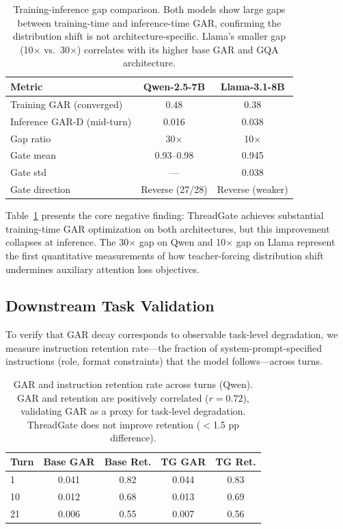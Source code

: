\documentclass[11pt]{article}
\begin{document}
\begin{table}[t]
\centering
\small
\begin{tabular}{lcc}
\toprule
\textbf{Metric} & \textbf{Qwen-2.5-7B} & \textbf{Llama-3.1-8B} \\
\midrule
Training GAR (converged)   & 0.48  & 0.38  \\
Inference GAR-D (mid-turn) & 0.016 & 0.038 \\
Gap ratio                  & 30$\times$ & 10$\times$ \\
\midrule
Gate mean                  & 0.93--0.98 & 0.945 \\
Gate std                   & ---        & 0.038 \\
Gate direction             & Reverse (27/28) & Reverse (weaker) \\
\bottomrule
\end{tabular}
\caption{Training-inference gap comparison. Both models show large gaps between training-time and inference-time GAR, confirming the distribution shift is not architecture-specific. Llama's smaller gap (10$\times$ vs.\ 30$\times$) correlates with its higher base GAR and GQA architecture.}
\label{tab:gap}
\end{table}

Table~\ref{tab:gap} presents the core negative finding: ThreadGate achieves substantial training-time GAR optimization on both architectures, but this improvement collapses at inference.
The 30$\times$ gap on Qwen and 10$\times$ gap on Llama represent the first quantitative measurements of how teacher-forcing distribution shift undermines auxiliary attention loss objectives.

\subsection{Downstream Task Validation}

To verify that GAR decay corresponds to observable task-level degradation, we measure instruction retention rate---the fraction of system-prompt-specified instructions (role, format constraints) that the model follows---across turns.

\begin{table}[t]
\centering
\small
\begin{tabular}{lcccc}
\toprule
\textbf{Turn} & \textbf{Base GAR} & \textbf{Base Ret.} & \textbf{TG GAR} & \textbf{TG Ret.} \\
\midrule
1  & 0.041 & 0.82 & 0.044 & 0.83 \\
10 & 0.012 & 0.68 & 0.013 & 0.69 \\
21 & 0.006 & 0.55 & 0.007 & 0.56 \\
\bottomrule
\end{tabular}
\caption{GAR and instruction retention rate across turns (Qwen). GAR and retention are positively correlated ($r{=}0.72$), validating GAR as a proxy for task-level degradation. ThreadGate does not improve retention ($<$1.5 pp difference).}
\label{tab:retention}
\end{table}
\end{document}
